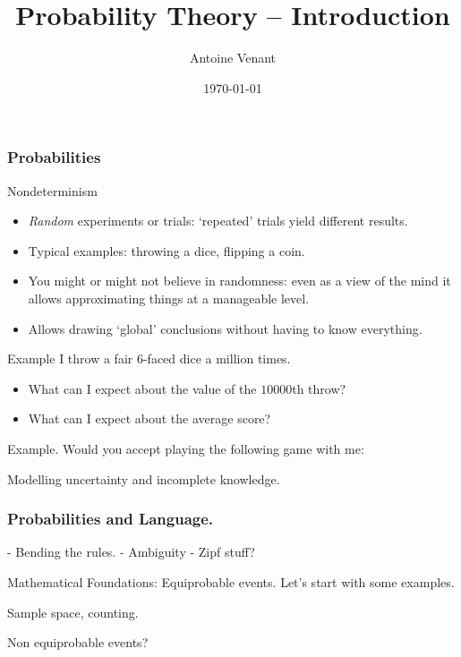 \documentclass{beamer}
\begin{document}
\title{Probability Theory -- Introduction} 
\author{Antoine Venant}
\date{\today}
\maketitle


\begin{frame}
  \frametitle{Probabilities}
  
  \begin{block}{Nondeterminism}
    \begin{itemize}
    \item \emph{Random} experiments or trials: `repeated' trials yield different results.
    \item Typical examples: throwing a dice, flipping a coin. 
    \item You might or might not believe in randomness: even as a view of the mind it allows approximating things at a manageable level.
    \item Allows drawing `global' conclusions without having to know everything.
    \end{itemize}
  \end{block}

  \begin{exampleblock}{Example}
    I throw a fair $6$-faced dice a million times.
    \begin{itemize}
    \item What can I expect about the value of the $10000$th throw?
    \item What can I expect about the average score?
    \end{itemize}
  \end{exampleblock}

\end{frame}

\begin{frame}
  \begin{exampleblock}{Example.}
    Would you accept playing the following game with me:
  \end{exampleblock}
  
  \begin{block}{Modelling uncertainty and incomplete knowledge.}
    
  \end{block}
  
\end{frame}

\begin{frame}
  \frametitle{Probabilities and Language.}
  - Bending the rules.
  - Ambiguity
  - Zipf stuff?
\end{frame}

\begin{frame}{Mathematical Foundations: Equiprobable events.}
  Let's start with some examples.
\end{frame}

\begin{frame}{Sample space, counting.}
\end{frame}

\begin{frame}{Non equiprobable events?}

\end{frame}
\end{document}
